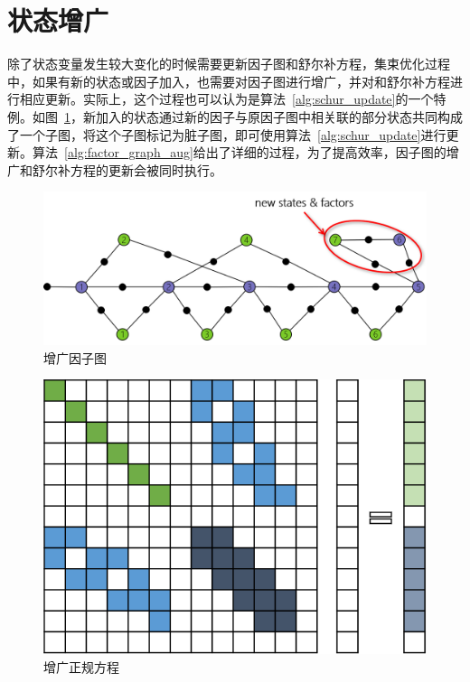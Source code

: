 \section{状态增广}

除了状态变量发生较大变化的时候需要更新因子图和舒尔补方程，集束优化过程中，如果有新的状态或因子加入，也需要对因子图进行增广，并对和舒尔补方程进行相应更新。实际上，这个过程也可以认为是算法~\ref{alg:schur_update}的一个特例。如图~\ref{fig:factor_graph_aug}，新加入的状态通过新的因子与原因子图中相关联的部分状态共同构成了一个子图，将这个子图标记为脏子图，即可使用算法~\ref{alg:schur_update}进行更新。算法~\ref{alg:factor_graph_aug}给出了详细的过程，为了提高效率，因子图的增广和舒尔补方程的更新会被同时执行。

\begin{figure}[htb!]
    \centering
    \includegraphics[scale=.7]{Pictures/factor_graph_aug.png}
    \caption{增广因子图}
    \label{fig:factor_graph_aug}
\end{figure}

\begin{figure}[htb!]
    \centering
    \includegraphics[scale=1]{Pictures/normal_eq_aug.png}
    \caption{增广正规方程}
    \label{fig:normal_eq_aug}
\end{figure}

